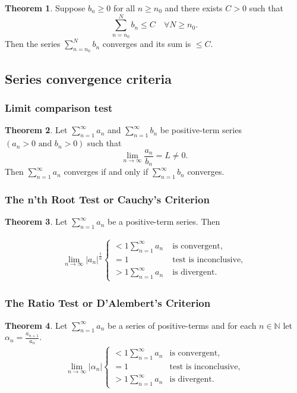 \documentclass[12pt, a4paper]{article}
\theoremstyle{definition}
\newtheorem{theorem}{Theorem}[section]
\theoremstyle{plain}
\begin{document}
\begin{theorem}
Suppose $b_n\geq 0$ for all $n\geq n_0$ and there exists $C>0$ such that $$\sum_{n=n_0}^{N} b_n \leq C \quad \forall N\geq n_0.$$ Then the series $\sum_{n=n_0}^{N} b_n$ converges and its sum is $\leq C.$
\end{theorem}

\subsection{Series convergence criteria}

\subsubsection{Limit comparison test}

\begin{theorem}
Let $\sum_{n=1}^{\infty} a_n$ and $\sum_{n=1}^{\infty} b_n$ be positive-term series $(a_n>0 \text{ and } b_n>0)$ such that $$\lim_{n\to \infty} \frac{a_n}{b_n} = L \neq 0.$$ Then $\sum_{n=1}^{\infty} a_n$ converges if and only if $\sum_{n=1}^{\infty} b_n$ converges.
\end{theorem}

\subsubsection{The n'th Root Test or Cauchy’s Criterion}

\begin{theorem}
Let $\sum_{n=1}^{\infty} a_n$ be a positive-term series. Then

$$\begin{aligned}
\lim_{n\to \infty} |a_n|^{\frac{1}{n}}
\begin{cases} 
      <1 \sum_{n=1}^{\infty} a_n \;&\text{is convergent,} \\
      =1 						\;&\text{test is inconclusive,}  \\
      >1 \sum_{n=1}^{\infty} a_n \;&\text{is divergent.}
\end{cases}
\end{aligned}$$

\end{theorem}

\subsubsection{The Ratio Test or D'Alembert's Criterion}

\begin{theorem}
Let $\sum_{n=1}^{\infty} a_n$ be a series of positive-terms and for each $n \in \mathbb{N}$ let $\alpha_n=\frac{a_{n+1}}{a_n}.$
$$\begin{aligned}
\lim_{n\to \infty} |\alpha_n|
\begin{cases} 
      <1 \sum_{n=1}^{\infty} a_n &\text{is convergent,} \\
      =1 							&\text{test is inconclusive,}  \\
      >1 \sum_{n=1}^{\infty} a_n &\text{is divergent.}
\end{cases}
\end{aligned}$$
\end{theorem}
\end{document}
